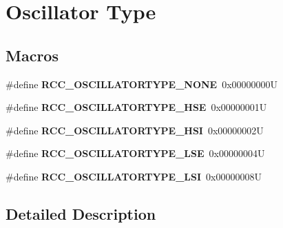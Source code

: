\hypertarget{group___r_c_c___oscillator___type}{}\section{Oscillator Type}
\label{group___r_c_c___oscillator___type}
\subsection*{Macros}
\begin{DoxyCompactItemize}
\item 
\mbox{\label{group___r_c_c___oscillator___type_ga5a790362c5d7c4263f0f75a7367dd6b9}} 
\#define {\bfseries R\+C\+C\+\_\+\+O\+S\+C\+I\+L\+L\+A\+T\+O\+R\+T\+Y\+P\+E\+\_\+\+N\+O\+NE}~0x00000000U
\item 
\mbox{\label{group___r_c_c___oscillator___type_ga28cacd402dec84e548c9e4ba86d4603f}} 
\#define {\bfseries R\+C\+C\+\_\+\+O\+S\+C\+I\+L\+L\+A\+T\+O\+R\+T\+Y\+P\+E\+\_\+\+H\+SE}~0x00000001U
\item 
\mbox{\label{group___r_c_c___oscillator___type_gaa7ff7cbe9b0c2c511b0d0555e2a32a23}} 
\#define {\bfseries R\+C\+C\+\_\+\+O\+S\+C\+I\+L\+L\+A\+T\+O\+R\+T\+Y\+P\+E\+\_\+\+H\+SI}~0x00000002U
\item 
\mbox{\label{group___r_c_c___oscillator___type_ga7036aec5659343c695d795e04d9152ba}} 
\#define {\bfseries R\+C\+C\+\_\+\+O\+S\+C\+I\+L\+L\+A\+T\+O\+R\+T\+Y\+P\+E\+\_\+\+L\+SE}~0x00000004U
\item 
\mbox{\label{group___r_c_c___oscillator___type_ga3b7abb8ce0544cca0aa4550540194ce2}} 
\#define {\bfseries R\+C\+C\+\_\+\+O\+S\+C\+I\+L\+L\+A\+T\+O\+R\+T\+Y\+P\+E\+\_\+\+L\+SI}~0x00000008U
\end{DoxyCompactItemize}


\subsection{Detailed Description}
